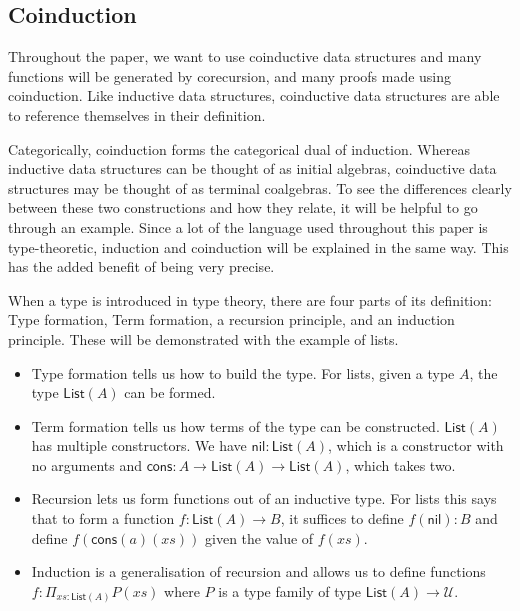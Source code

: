 \documentclass{article}
\theoremstyle{definition}
\theoremstyle{remark}
\begin{document}
\subsection{Coinduction}\label{sec:coinduction}

Throughout the paper, we want to use coinductive data structures and many functions will be generated by corecursion, and many proofs made using coinduction. Like inductive data structures, coinductive data structures are able to reference themselves in their definition.

Categorically, coinduction forms the categorical dual of induction. Whereas inductive data structures can be thought of as initial algebras, coinductive data structures may be thought of as terminal coalgebras. To see the differences clearly between these two constructions and how they relate, it will be helpful to go through an example. Since a lot of the language used throughout this paper is type-theoretic, induction and coinduction will be explained in the same way. This has the added benefit of being very precise.

When a type is introduced in type theory, there are four parts of its definition: Type formation, Term formation, a recursion principle, and an induction principle. These will be demonstrated with the example of lists.
\begin{itemize}
\item Type formation tells us how to build the type. For lists, given a type \(A\), the type \(\mathsf{List}(A)\) can be formed.
\item Term formation tells us how terms of the type can be constructed. \(\mathsf{List}(A)\) has multiple constructors. We have \(\mathsf{nil} : \mathsf{List}(A)\), which is a constructor with no arguments and \(\mathsf{cons} : A \to \mathsf{List}(A) \to \mathsf{List}(A)\), which takes two.
\item Recursion lets us form functions out of an inductive type. For lists this says that to form a function \(f : \mathsf{List}(A) \to B\), it suffices to define \(f(\mathsf{nil}) : B\) and define \(f(\mathsf{cons}(a)(xs))\) given the value of \(f(xs)\).
\item Induction is a generalisation of recursion and allows us to define functions \(f : \Pi_{xs : \mathsf{List}(A)} P(xs)\) where \(P\) is a type family of type \(\mathsf{List}(A) \to \mathcal{U}\).
\end{itemize}
\end{document}
